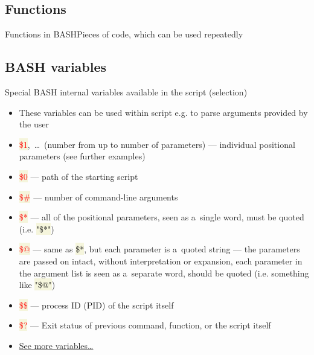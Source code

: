 \documentclass[compress, ucs, xelatex, 11pt, xcolor=svgnames, aspectratio=169,
	hyperref={
		bookmarks=true,
		unicode=true,
		colorlinks=true,
		pdftitle={Linux, command line and MetaCentrum},
		plainpages=false,
		pdfauthor={Vojtech Zeisek},
		pdfsubject={Course about use of Linux command line, writing shell scripts and using MetaCentrum of CESNET},
		pdfcreator={XeLaTeX},
		pdfkeywords={Linux, GNU, BASH, shell, command line, MetaCentrum},
		linkcolor=DarkRed, %
		anchorcolor=DarkBlue, %
		citecolor=Indigo, %
		filecolor=NavyBlue, %
		menucolor=DarkMagenta, %
		urlcolor=DarkBlue, %
		pdftex},
	url={hyphens, lowtilde} %
	]{beamer}
\renewcommand{\texttt}[1]{\colorbox{Beige}{{\ttfamily #1}}}
\renewcommand{\alert}[1]{\textcolor{red}{#1}}
\begin{document}
\subsection{Functions}

\begin{frame}[fragile]{Functions in BASH}{Pieces of code, which can be used repeatedly}
\end{frame}

\subsection{BASH variables}

\begin{frame}{Special BASH internal variables available in the script (selection)}
	\begin{itemize}
		\item These variables can be used within script e.g. to parse arguments provided by the user
		\item \alert{\texttt{\$1}},~\ldots~(number from \texttt{1} up to number of parameters) --- individual positional parameters (see further examples)
		\item \alert{\texttt{\$0}} --- path of the starting script
		\item \alert{\texttt{\$\#}} --- number of command-line arguments
		\item \alert{\texttt{\$*}} --- all of the positional parameters, seen as a~single word, must be quoted (i.e. \texttt{"\$*"})
		\item \alert{\texttt{\$@}} --- same as \texttt{\$*}, but each parameter is a~quoted string --- the parameters are passed on intact, without interpretation or expansion, each parameter in the argument list is seen as a~separate word, should be quoted (i.e. something like \texttt{"\$@"})
		\item \alert{\texttt{\$\$}} --- process ID (PID) of the script itself
		\item \alert{\texttt{\$?}} --- Exit status of previous command, function, or the script itself
		\item \href{https://tldp.org/LDP/abs/html/internalvariables.html}{See more variables\ldots}
	\end{itemize}
\end{frame}
\end{document}
